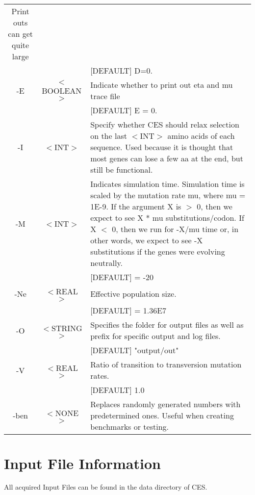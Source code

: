 \documentclass{article}
\begin{document}
{\begin{tabular}{|c|c|p{10cm}|}
			Print outs can get quite large\\
			& & [DEFAULT] D=0.  \\
			\hline
			-E & $<$BOOLEAN$>$ & Indicate whether to print out eta and mu trace file\\
			& & [DEFAULT] E = 0. \\
			\hline
			-I & $<$INT$>$ & Specify whether CES should relax selection on the last $<$INT$>$ 
			amino acids of each sequence.  Used because it is thought that
			most genes can lose a few aa at the end, but still be 
			functional.\\
			\hline
			-M & $<$INT$>$ & Indicates simulation time. Simulation time is scaled by the mutation rate mu,  
			where mu = 1E-9. 
			If the argument X is $>$ 0, then we expect to see X * mu substitutions/codon.
			If X $<$ 0, then we run for -X/mu time or, in other words, we expect to see -X
			substitutions if the genes were evolving neutrally.\\
			& & [DEFAULT] = -20 \\
			\hline
			-Ne & $<$REAL$>$ & Effective population size. \\
			& & [DEFAULT] = 1.36E7\\
			\hline
			-O & $<$STRING$>$ & Specifies the folder for output files as well as prefix for specific
			output and log files.\\
			& & [DEFAULT] "output/out"\\
			\hline			
			-V & $<$REAL$>$ & Ratio of transition to transversion mutation rates.\\
			& & [DEFAULT] 1.0 \\
			\hline
			-ben & $<$NONE$>$ & Replaces randomly generated numbers with predetermined ones. 
			Useful when creating benchmarks or testing.\\
			\hline
		 \end{tabular}}
		

\section{Input File Information}
	All acquired Input Files can be found in the data directory of CES.
\end{document}
